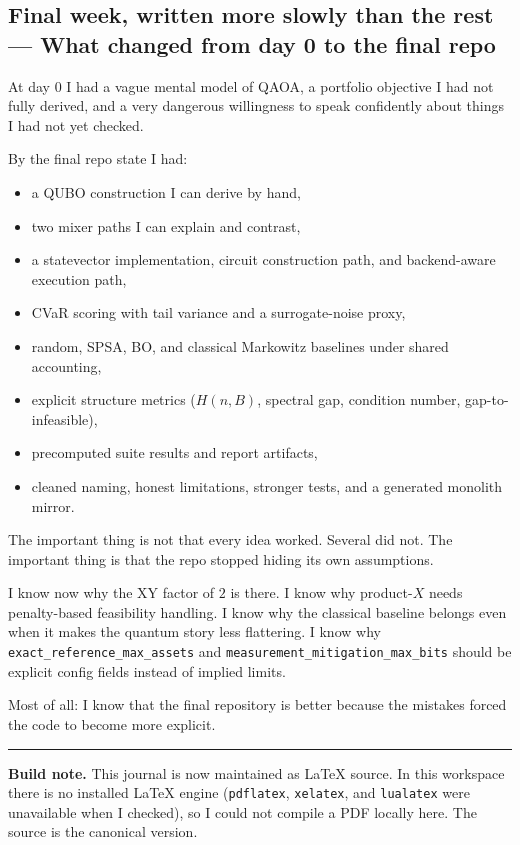 \documentclass[11pt]{article}
\newcommand{\entry}[2]{\subsection*{#1 --- #2}}
\newcommand{\repo}[1]{\texttt{#1}}
\begin{document}
\entry{Final week, written more slowly than the rest}{What changed from day 0 to the final repo}

At day 0 I had a vague mental model of QAOA, a portfolio objective I had not fully derived, and a
very dangerous willingness to speak confidently about things I had not yet checked.

By the final repo state I had:
\begin{itemize}[leftmargin=1.4em]
\item a QUBO construction I can derive by hand,
\item two mixer paths I can explain and contrast,
\item a statevector implementation, circuit construction path, and backend-aware execution path,
\item CVaR scoring with tail variance and a surrogate-noise proxy,
\item random, SPSA, BO, and classical Markowitz baselines under shared accounting,
\item explicit structure metrics (\(H(n,B)\), spectral gap, condition number, gap-to-infeasible),
\item precomputed suite results and report artifacts,
\item cleaned naming, honest limitations, stronger tests, and a generated monolith mirror.
\end{itemize}

The important thing is not that every idea worked.
Several did not.
The important thing is that the repo stopped hiding its own assumptions.

I know now why the XY factor of \(2\) is there.
I know why product-\(X\) needs penalty-based feasibility handling.
I know why the classical baseline belongs even when it makes the quantum story less flattering.
I know why \repo{exact\_reference\_max\_assets} and \repo{measurement\_mitigation\_max\_bits}
should be explicit config fields instead of implied limits.

Most of all: I know that the final repository is better because the mistakes forced the code to
become more explicit.

\vspace{1em}
\hrule
\vspace{0.8em}

\textbf{Build note.} This journal is now maintained as LaTeX source.
In this workspace there is no installed LaTeX engine (\repo{pdflatex}, \repo{xelatex}, and
\repo{lualatex} were unavailable when I checked), so I could not compile a PDF locally here.
The source is the canonical version.
\end{document}
